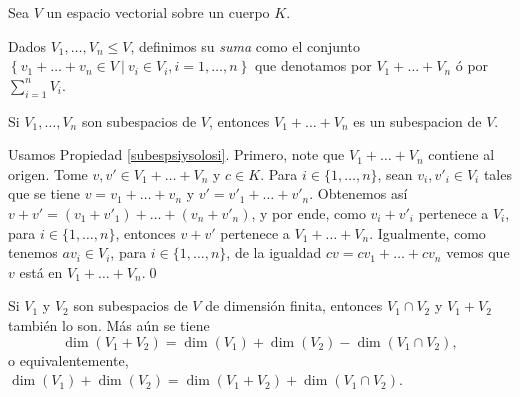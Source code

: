 Sea $V$ un espacio vectorial sobre un cuerpo $K$.

\begin{defn}
Dados $V_1,\ldots,V_n\le V$, definimos su \emph{suma} como el conjunto $\left\{v_1+\ldots+v_n\in V\ |\ v_i\in V_i, i=1,\ldots,n \right\}$ que denotamos por $V_1+\ldots+V_n$ \'o por $\sum_{i=1}^n V_i$.
\end{defn}

\begin{pro}
Si $V_1,\ldots,V_n$ son subespacios de $V$, entonces $V_1+\ldots+V_n$ es un subespacion de $V$.
\end{pro}

\dem Usamos Propiedad \ref{subespsiysolosi}. Primero, note que $V_1+\ldots+V_n$ contiene al origen. Tome $v,v'\in  V_1+\ldots+V_n$ y $c\in K$. Para $i\in\{1,\ldots,n\}$, sean $v_i,v'_i\in V_i$ tales que se tiene $v=v_1+\ldots+v_n$ y $v'=v'_1+\ldots+v'_n$. Obtenemos as\'i $v+v'=(v_1+v'_1)+\ldots+(v_n+v'_n)$, y por ende, como $v_i+v'_i$ pertenece a $V_i$, para $i\in\{1,\ldots,n\}$, entonces $v+v'$ pertenece a $V_1+\ldots+V_n$. Igualmente, como tenemos $av_i\in V_i$, para $i\in\{1,\ldots,n\}$, de la igualdad $cv=cv_1+\ldots+cv_n$ vemos que $ v$ est\'a en $V_1+\ldots+V_n$.\qed

\begin{teo}\label{sumaint}
Si $V_1$ y $V_2$ son subespacios de $V$ de dimensi\'on finita, entonces $V_1\cap V_2$ y $V_1+V_2$ tambi\'en lo son. M\'as a\'un se tiene
\[
\dim(V_1+V_2)=\dim(V_1)+\dim(V_2)-\dim(V_1\cap V_2),
\]
o equivalentemente, $\dim(V_1)+\dim(V_2)=\dim(V_1+V_2)+\dim(V_1\cap V_2)$.
\end{teo}

